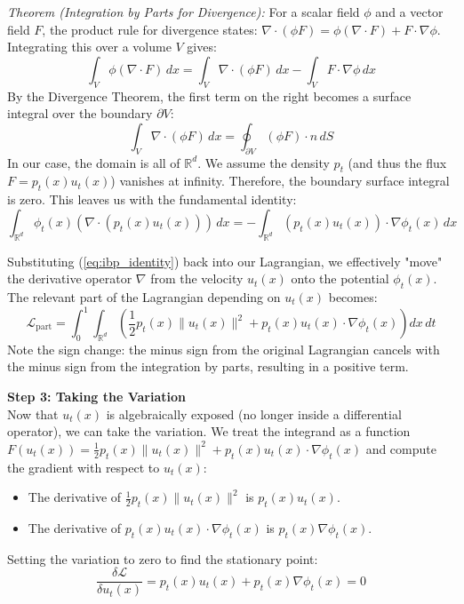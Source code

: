 \documentclass{book}
\begin{document}
\textit{Theorem (Integration by Parts for Divergence):}
For a scalar field $\phi$ and a vector field $F$, the product rule for divergence states: $\nabla \cdot (\phi F) = \phi (\nabla \cdot F) + F \cdot \nabla \phi$. Integrating this over a volume $V$ gives:
\begin{equation}
\int_V \phi (\nabla \cdot F) \, dx = \int_V \nabla \cdot (\phi F) \, dx - \int_V F \cdot \nabla \phi \, dx
\end{equation}
By the Divergence Theorem, the first term on the right becomes a surface integral over the boundary $\partial V$:
\begin{equation}
\int_V \nabla \cdot (\phi F) \, dx = \oint_{\partial V} (\phi F) \cdot n \, dS
\end{equation}
In our case, the domain is all of $\mathbb{R}^d$. We assume the density $p_t$ (and thus the flux $F = p_t(x) u_t(x)$) vanishes at infinity. Therefore, the boundary surface integral is zero. This leaves us with the fundamental identity:
\begin{equation} \label{eq:ibp_identity}
\int_{\mathbb{R}^d} \phi_t(x) (\nabla \cdot (p_t(x) u_t(x))) \, dx = - \int_{\mathbb{R}^d} (p_t(x) u_t(x)) \cdot \nabla \phi_t(x) \, dx
\end{equation}

Substituting (\ref{eq:ibp_identity}) back into our Lagrangian, we effectively "move" the derivative operator $\nabla$ from the velocity $u_t(x)$ onto the potential $\phi_t(x)$. The relevant part of the Lagrangian depending on $u_t(x)$ becomes:
\begin{equation}
\mathcal{L}_{\text{part}} = \int_0^1 \int_{\mathbb{R}^d} \left( \frac{1}{2} p_t(x) \|u_t(x)\|^2 + p_t(x) u_t(x) \cdot \nabla \phi_t(x) \right) dx \, dt
\end{equation}
Note the sign change: the minus sign from the original Lagrangian cancels with the minus sign from the integration by parts, resulting in a positive term.

\textbf{Step 3: Taking the Variation} \\
Now that $u_t(x)$ is algebraically exposed (no longer inside a differential operator), we can take the variation. We treat the integrand as a function $F(u_t(x)) = \frac{1}{2}p_t(x) \|u_t(x)\|^2 + p_t(x) u_t(x) \cdot \nabla \phi_t(x)$ and compute the gradient with respect to $u_t(x)$:
\begin{itemize}
    \item The derivative of $\frac{1}{2} p_t(x) \|u_t(x)\|^2$ is $p_t(x) u_t(x)$.
    \item The derivative of $p_t(x) u_t(x) \cdot \nabla \phi_t(x)$ is $p_t(x) \nabla \phi_t(x)$.
\end{itemize}
Setting the variation to zero to find the stationary point:
\begin{equation}
\frac{\delta \mathcal{L}}{\delta u_t(x)} = p_t(x) u_t(x) + p_t(x) \nabla \phi_t(x) = 0
\end{equation}
\end{document}
